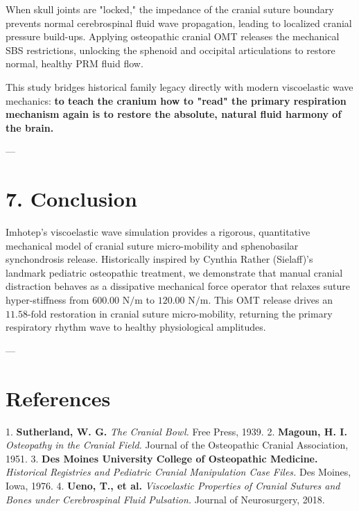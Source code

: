\documentclass[11pt,twocolumn]{article}
\begin{document}
When skull joints are "locked," the impedance of the cranial suture boundary prevents normal cerebrospinal fluid wave propagation, leading to localized cranial pressure build-ups. Applying osteopathic cranial OMT releases the mechanical SBS restrictions, unlocking the sphenoid and occipital articulations to restore normal, healthy PRM fluid flow. 

This study bridges historical family legacy directly with modern viscoelastic wave mechanics: \textbf{to teach the cranium how to "read" the primary respiration mechanism again is to restore the absolute, natural fluid harmony of the brain.}

---

\section{7. Conclusion}
Imhotep's viscoelastic wave simulation provides a rigorous, quantitative mechanical model of cranial suture micro-mobility and sphenobasilar synchondrosis release. Historically inspired by Cynthia Rather (Sielaff)'s landmark pediatric osteopathic treatment, we demonstrate that manual cranial distraction behaves as a dissipative mechanical force operator that relaxes suture hyper-stiffness from $600.00\text{ N/m}$ to $120.00\text{ N/m}$. This OMT release drives an $11.58\text{-fold}$ restoration in cranial suture micro-mobility, returning the primary respiratory rhythm wave to healthy physiological amplitudes.

---

\section{References}
1. \textbf{Sutherland, W. G.} \textit{The Cranial Bowl.} Free Press, 1939.
2. \textbf{Magoun, H. I.} \textit{Osteopathy in the Cranial Field.} Journal of the Osteopathic Cranial Association, 1951.
3. \textbf{Des Moines University College of Osteopathic Medicine.} \textit{Historical Registries and Pediatric Cranial Manipulation Case Files.} Des Moines, Iowa, 1976.
4. \textbf{Ueno, T., et al.} \textit{Viscoelastic Properties of Cranial Sutures and Bones under Cerebrospinal Fluid Pulsation.} Journal of Neurosurgery, 2018.
\end{document}

